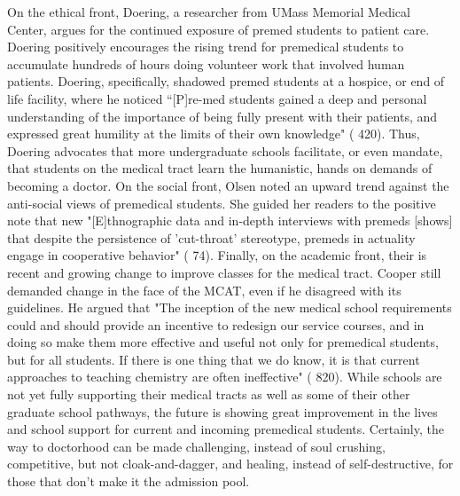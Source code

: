 \documentclass [12pt]{article}
\begin{document}
\begin{flushleft}
On the ethical front, Doering, a researcher from UMass Memorial Medical Center, argues for the continued exposure of premed students to patient care. Doering positively encourages the rising trend for premedical students to accumulate hundreds of hours doing volunteer work that involved human patients. Doering, specifically, shadowed premed students at a hospice, or end of life facility, where he noticed {``}[P]re-med students gained a deep and personal understanding of the importance of being fully present with their patients, and expressed great humility at the limits of their own knowledge" (\cite{Doering-2015} 420). Thus, Doering advocates that more undergraduate schools facilitate, or even mandate, that students on the medical tract learn the humanistic, hands on demands of becoming a doctor. On the social front, Olsen noted an upward trend against the anti-social views of premedical students. She guided her readers to the positive note that new "[E]thnographic data and in-depth interviews with premeds [shows] that despite the persistence of 'cut-throat' stereotype, premeds in actuality engage in cooperative behavior" (\cite{Olsen-2016} 74). Finally, on the academic front, their is recent and growing change to improve classes for the medical tract. Cooper still demanded change in the face of the MCAT, even if he disagreed with its guidelines. He argued that "The inception of the new medical school requirements could and should provide an incentive to redesign our service courses, and in doing so make them more effective and useful not only for premedical students, but for all students. If there is one thing that we do know, it is that current approaches to teaching chemistry are often ineffective" (\cite{Cooper-2013} 820). While schools are not yet fully supporting their medical tracts as well as some of their other graduate school pathways, the future is showing great improvement in the lives and school support for current and incoming premedical students. Certainly, the way to doctorhood can be made challenging, instead of soul crushing, competitive, but not cloak-and-dagger, and healing, instead of self-destructive, for those that don't make it the admission pool.
\newpage
\medskip %
\nocite{*} %
\printbibliography%
\end{flushleft}
\end{document}
